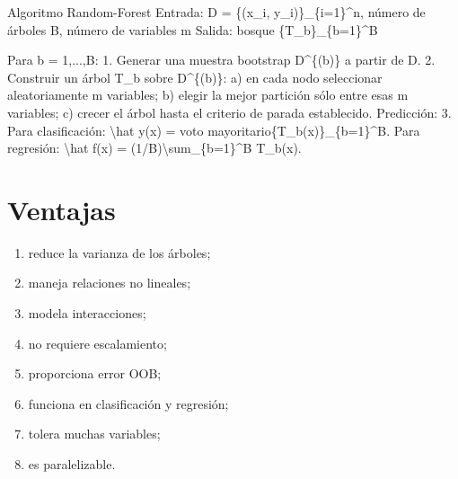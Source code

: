 \documentclass[
  spanish,
  10.5pt,
  letterpaper,
  DIV=11,
  numbers=noendperiod,
  oneside,
  open=any]{scrreprt}
\newenvironment{Shaded}{\begin{snugshade}}{\end{snugshade}}
\newcommand{\NormalTok}[1]{\textcolor[rgb]{0.00,0.23,0.31}{#1}}
\providecommand{\tightlist}{%
  \setlength{\itemsep}{0pt}\setlength{\parskip}{0pt}}
\theoremstyle{definition}
\theoremstyle{definition}
\theoremstyle{plain}
\theoremstyle{remark}
\begin{document}
\begin{tcolorbox}[enhanced jigsaw, arc=.35mm, bottomrule=.15mm, bottomtitle=1mm, breakable, colback=white, colbacktitle=quarto-callout-note-color!10!white, colframe=quarto-callout-note-color-frame, coltitle=black, left=2mm, leftrule=.75mm, opacityback=0, opacitybacktitle=0.6, rightrule=.15mm, title=\textcolor{quarto-callout-note-color}{\faInfo}\hspace{0.5em}{Seudocódigo matemático formal}, titlerule=0mm, toprule=.15mm, toptitle=1mm]

\begin{Shaded}
\begin{Highlighting}[numbers=left,,]
\NormalTok{Algoritmo Random{-}Forest}
\NormalTok{Entrada:}
\NormalTok{  D = \{(x\_i, y\_i)\}\_\{i=1\}\^{}n, número de árboles B, número de variables m}
\NormalTok{Salida:}
\NormalTok{  bosque \{T\_b\}\_\{b=1\}\^{}B}

\NormalTok{Para b = 1,...,B:}
\NormalTok{1. Generar una muestra bootstrap D\^{}\{(b)\} a partir de D.}
\NormalTok{2. Construir un árbol T\_b sobre D\^{}\{(b)\}:}
\NormalTok{   a) en cada nodo seleccionar aleatoriamente m variables;}
\NormalTok{   b) elegir la mejor partición sólo entre esas m variables;}
\NormalTok{   c) crecer el árbol hasta el criterio de parada establecido.}
\NormalTok{Predicción:}
\NormalTok{3. Para clasificación:}
\NormalTok{      \textbackslash{}hat y(x) = voto mayoritario\{T\_b(x)\}\_\{b=1\}\^{}B.}
\NormalTok{   Para regresión:}
\NormalTok{      \textbackslash{}hat f(x) = (1/B)\textbackslash{}sum\_\{b=1\}\^{}B T\_b(x).}
\end{Highlighting}
\end{Shaded}

\end{tcolorbox}

\section*{Ventajas}\label{ventajas-2}


\begin{enumerate}
\def\labelenumi{\arabic{enumi}.}
\tightlist
\item
  reduce la varianza de los árboles;
\item
  maneja relaciones no lineales;
\item
  modela interacciones;
\item
  no requiere escalamiento;
\item
  proporciona error OOB;
\item
  funciona en clasificación y regresión;
\item
  tolera muchas variables;
\item
  es paralelizable.
\end{enumerate}
\end{document}
